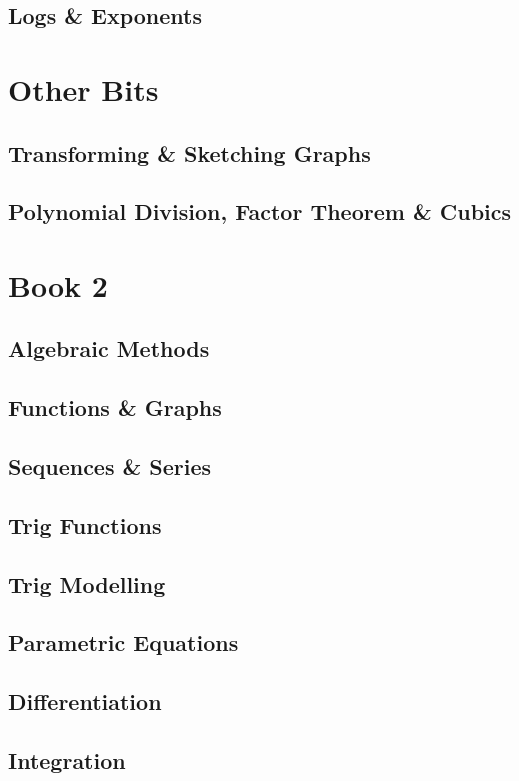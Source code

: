 \documentclass{report}
\begin{document}
\chapter{Logs \& Exponents}



\part{Other Bits}
\setcounter{chapter}{0}
\chapter{Transforming \& Sketching Graphs}

\chapter{Polynomial Division, Factor Theorem \& Cubics}



\part{Book 2}

\setcounter{chapter}{0}
\chapter{Algebraic Methods}


\chapter{Functions \& Graphs}


\chapter{Sequences \& Series}


\setcounter{chapter}{5}
\chapter{Trig Functions}


\chapter{Trig Modelling}


\chapter{Parametric Equations}


\chapter{Differentiation}


\setcounter{chapter}{10}
\chapter{Integration}

\end{document}
